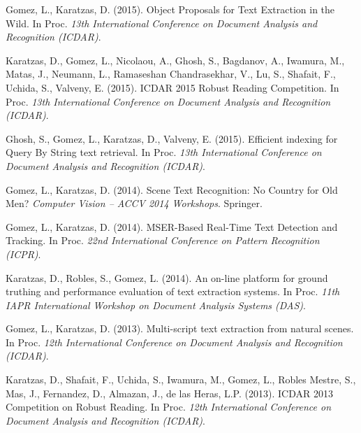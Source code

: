 \documentclass[11pt]{article}
\newcommand{\venue}[1]{\textit{#1}}
\begin{document}
\begin{pubs}
\item Gomez, L., Karatzas, D. (2015). Object Proposals for Text Extraction in the Wild. In Proc. \venue{13th International Conference on Document Analysis and Recognition (ICDAR)}.
\item Karatzas, D., Gomez, L., Nicolaou, A., Ghosh, S., Bagdanov, A., Iwamura, M., Matas, J., Neumann, L., Ramaseshan Chandrasekhar, V., Lu, S., Shafait, F., Uchida, S., Valveny, E. (2015). ICDAR 2015 Robust Reading Competition. In Proc. \venue{13th International Conference on Document Analysis and Recognition (ICDAR)}.
\item Ghosh, S., Gomez, L., Karatzas, D., Valveny, E. (2015). Efficient indexing for Query By String text retrieval. In Proc. \venue{13th International Conference on Document Analysis and Recognition (ICDAR)}.
\item Gomez, L., Karatzas, D. (2014). Scene Text Recognition: No Country for Old Men? \venue{Computer Vision -- ACCV 2014 Workshops}. Springer.
\item Gomez, L., Karatzas, D. (2014). MSER-Based Real-Time Text Detection and Tracking. In Proc. \venue{22nd International Conference on Pattern Recognition (ICPR)}.
\item Karatzas, D., Robles, S., Gomez, L. (2014). An on-line platform for ground truthing and performance evaluation of text extraction systems. In Proc. \venue{11th IAPR International Workshop on Document Analysis Systems (DAS)}.
\item Gomez, L., Karatzas, D. (2013). Multi-script text extraction from natural scenes. In Proc. \venue{12th International Conference on Document Analysis and Recognition (ICDAR)}.
\item Karatzas, D., Shafait, F., Uchida, S., Iwamura, M., Gomez, L., Robles Mestre, S., Mas, J., Fernandez, D., Almazan, J., de las Heras, L.P. (2013). ICDAR 2013 Competition on Robust Reading. In Proc. \venue{12th International Conference on Document Analysis and Recognition (ICDAR)}.
\end{pubs}

\end{document}
